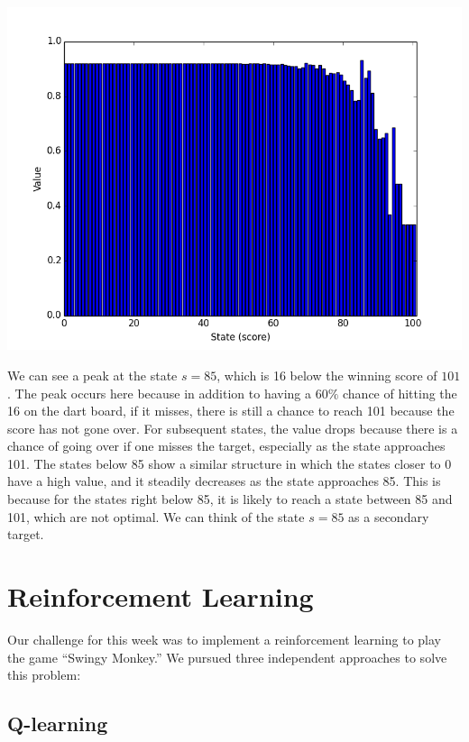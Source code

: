 \documentclass[11pt]{amsart}
\begin{document}
\includegraphics[width=14cm]{values_gamma1.png}

We can see a peak at the state $s=85$, which is 16 below the winning score of $101$. The peak occurs here because in addition to having a $60\%$ chance of hitting the 16 on the dart board, if it misses, there is still a chance to reach 101 because the score has not gone over. For subsequent states, the value drops because there is a chance of going over if one misses the target, especially as the state approaches 101. 
The states below 85 show a similar structure in which the states closer to 0 have a high value, and it steadily decreases as the state approaches 85. This is because for the states right below 85, it is likely to reach a state between 85 and 101, which are not optimal. We can think of the state $s=85$ as a secondary target.

\section{Reinforcement Learning}

Our challenge for this week was to implement a reinforcement learning to play
the game ``Swingy Monkey.'' We pursued three independent approaches to solve this 
problem:

\subsection{Q-learning}
\end{document}
